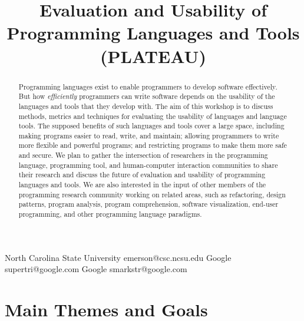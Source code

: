\documentclass{sigplanconf}
\begin{document}
\title{Evaluation and Usability of Programming Languages and Tools (PLATEAU)}

           {North Carolina State University}
           {emerson@csc.ncsu.edu}
           {Google}
           {supertri@google.com}
           {Google}
           {smarkstr@google.com}      
\date{}

\maketitle
\begin{abstract}

  Programming languages exist to enable programmers to develop
  software effectively.  But how \emph{efficiently} programmers can
  write software depends on the usability of the languages and tools
  that they develop with.  The aim of this workshop is to discuss
  methods, metrics and techniques for evaluating the usability of
  languages and language tools.  The supposed benefits of such
  languages and tools cover a large space, including making programs
  easier to read, write, and maintain; allowing programmers to write
  more flexible and powerful programs; and restricting programs to
  make them more safe and secure. We plan to gather the intersection
  of researchers in the programming language, programming tool, and
  human-computer interaction communities to share their research and
  discuss the future of evaluation and usability of programming
  languages and tools. We are also interested in the input of other
  members of the programming research community working on related
  areas, such as refactoring, design patterns, program analysis,
  program comprehension, software visualization, end-user programming,
  and other programming language paradigms.

\end{abstract}





\section{Main Themes and Goals}
\end{document}
